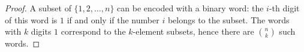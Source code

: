 

\setcounter{section}{3}
\setcounter{subsection}{2}
\setcounter{dfn}{3}

\begin{proof}
A subset of $\{1, 2, \ldots, n\}$ can be encoded with a binary word:
the $i$-th digit of this word is $1$ if and only if the number $i$ belongs to the subset.
The words with $k$ digits $1$ correspond to the $k$-element subsets, hence there are $\binom{n}{k}$ such words.
\end{proof}




